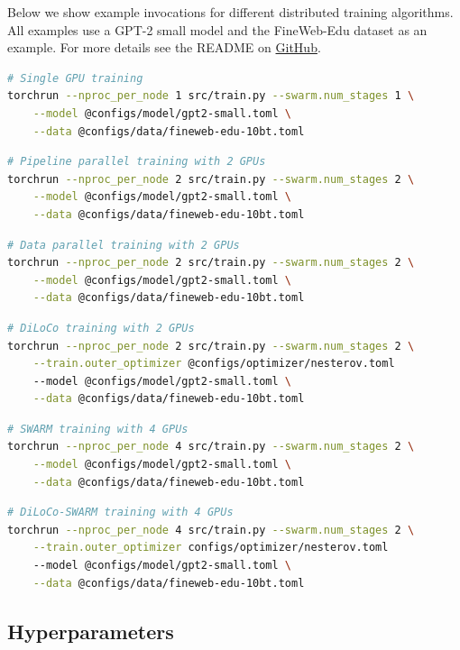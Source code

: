 \documentclass{article}
\newcommand{\github}{\href{https://github.com/mikasenghaas/diloco-swarm}{GitHub}}
\begin{document}
Below we show example invocations for different distributed training algorithms.
All examples use a GPT-2 small model and the FineWeb-Edu dataset as an example.
For more details see the README on \github.

\begin{lstlisting}[language=bash]
# Single GPU training
torchrun --nproc_per_node 1 src/train.py --swarm.num_stages 1 \
    --model @configs/model/gpt2-small.toml \
    --data @configs/data/fineweb-edu-10bt.toml
\end{lstlisting}

\begin{lstlisting}[language=bash]
# Pipeline parallel training with 2 GPUs
torchrun --nproc_per_node 2 src/train.py --swarm.num_stages 2 \
    --model @configs/model/gpt2-small.toml \
    --data @configs/data/fineweb-edu-10bt.toml
\end{lstlisting}

\begin{lstlisting}[language=bash]
# Data parallel training with 2 GPUs
torchrun --nproc_per_node 2 src/train.py --swarm.num_stages 2 \
    --model @configs/model/gpt2-small.toml \
    --data @configs/data/fineweb-edu-10bt.toml
\end{lstlisting}

\begin{lstlisting}[language=bash]
# DiLoCo training with 2 GPUs
torchrun --nproc_per_node 2 src/train.py --swarm.num_stages 2 \
    --train.outer_optimizer @configs/optimizer/nesterov.toml
    --model @configs/model/gpt2-small.toml \
    --data @configs/data/fineweb-edu-10bt.toml
\end{lstlisting}

\begin{lstlisting}[language=bash]
# SWARM training with 4 GPUs
torchrun --nproc_per_node 4 src/train.py --swarm.num_stages 2 \
    --model @configs/model/gpt2-small.toml \
    --data @configs/data/fineweb-edu-10bt.toml
\end{lstlisting}

\begin{lstlisting}[language=bash]
# DiLoCo-SWARM training with 4 GPUs
torchrun --nproc_per_node 4 src/train.py --swarm.num_stages 2 \
    --train.outer_optimizer configs/optimizer/nesterov.toml
    --model @configs/model/gpt2-small.toml \
    --data @configs/data/fineweb-edu-10bt.toml
\end{lstlisting}

\subsection{Hyperparameters}
\end{document}
